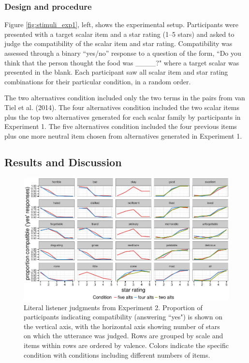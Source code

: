 \documentclass[10pt, letterpaper]{article}
\newenvironment{CodeChunk}{}{}
\begin{document}
\subsubsection{Design and procedure}\label{design-and-procedure-1}

Figure \ref{fig:stimuli_exp1}, left, shows the experimental setup.
Participants were presented with a target scalar item and a star rating
(1--5 stars) and asked to judge the compatibility of the scalar item and
star rating. Compatibility was assessed through a binary ``yes/no''
response to a question of the form, ``Do you think that the person
thought the food was \_\_\_\_?" where a target scalar was presented in
the blank. Each participant saw all scalar item and star rating
combinations for their particular condition, in a random order.

The two alternatives condition included only the two terms in the pairs
from {van Tiel} et al. (2014). The four alternatives condition included
the two scalar items plus the top two alternatives generated for each
scalar family by participants in Experiment 1. The five alternatives
condition included the four previous items plus one more neutral item
chosen from alternatives generated in Experiment 1.

\subsection{Results and Discussion}\label{results-and-discussion-1}

\begin{CodeChunk}
\begin{figure}[t]

{\centering \includegraphics{figs/exp1Plots-1} 

}

\caption[Literal listener judgments from Experiment 2]{Literal listener judgments from Experiment 2. Proportion of participants indicating compatibility (answering ``yes") is shown on the vertical axis, with the horizontal axis showing number of stars on which the utterance was judged. Rows are grouped by scale and items within rows are ordered by valence. Colors indicate the specific condition with conditions including different numbers of items.}\label{fig:exp1Plots}
\end{figure}
\end{CodeChunk}
\end{document}
